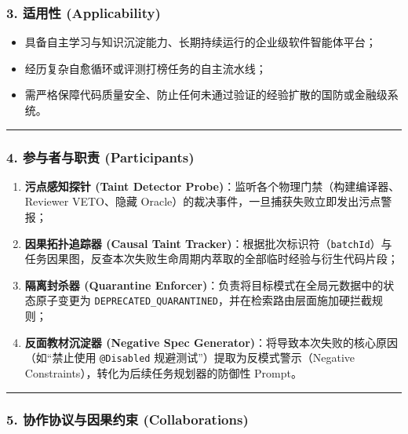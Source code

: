 \subsubsection{3. 适用性
(Applicability)}\label{ux9002ux7528ux6027-applicability-14}

\begin{itemize}
\tightlist
\item
  具备自主学习与知识沉淀能力、长期持续运行的企业级软件智能体平台；
\item
  经历复杂自愈循环或评测打榜任务的自主流水线；
\item
  需严格保障代码质量安全、防止任何未通过验证的经验扩散的国防或金融级系统。
\end{itemize}

\begin{center}\rule{0.5\linewidth}{0.5pt}\end{center}

\subsubsection{4. 参与者与职责
(Participants)}\label{ux53c2ux4e0eux8005ux4e0eux804cux8d23-participants-14}

\begin{enumerate}
\def\labelenumi{\arabic{enumi}.}
\tightlist
\item
  \textbf{污点感知探针 (Taint Detector
  Probe)}：监听各个物理门禁（构建编译器、Reviewer VETO、隐藏
  Oracle）的裁决事件，一旦捕获失败立即发出污点警报；
\item
  \textbf{因果拓扑追踪器 (Causal Taint
  Tracker)}：根据批次标识符（\texttt{batchId}）与任务因果图，反查本次失败生命周期内萃取的全部临时经验与衍生代码片段；
\item
  \textbf{隔离封杀器 (Quarantine
  Enforcer)}：负责将目标模式在全局元数据中的状态原子变更为
  \texttt{DEPRECATED\_QUARANTINED}，并在检索路由层面施加硬拦截规则；
\item
  \textbf{反面教材沉淀器 (Negative Spec
  Generator)}：将导致本次失败的核心原因（如``禁止使用 \texttt{@Disabled}
  规避测试''）提取为反模式警示（Negative
  Constraints），转化为后续任务规划器的防御性 Prompt。
\end{enumerate}

\begin{center}\rule{0.5\linewidth}{0.5pt}\end{center}

\subsubsection{5. 协作协议与因果约束
(Collaborations)}\label{ux534fux4f5cux534fux8baeux4e0eux56e0ux679cux7ea6ux675f-collaborations-11}

